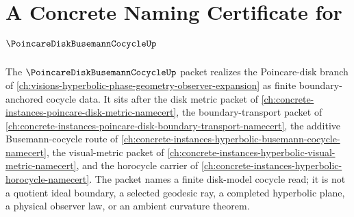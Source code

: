 \chapter{A Concrete Naming Certificate for $\PoincareDiskBusemannCocycleUp$}
\label{ch:concrete-instances-poincare-disk-busemann-cocycle-namecert}

The $\PoincareDiskBusemannCocycleUp$ packet realizes the Poincare-disk branch of \autoref{ch:visions-hyperbolic-phase-geometry-observer-expansion} as finite boundary-anchored cocycle data. It sits after the disk metric packet of \autoref{ch:concrete-instances-poincare-disk-metric-namecert}, the boundary-transport packet of \autoref{ch:concrete-instances-poincare-disk-boundary-transport-namecert}, the additive Busemann-cocycle route of \autoref{ch:concrete-instances-hyperbolic-busemann-cocycle-namecert}, the visual-metric packet of \autoref{ch:concrete-instances-hyperbolic-visual-metric-namecert}, and the horocycle carrier of \autoref{ch:concrete-instances-hyperbolic-horocycle-namecert}. The packet names a finite disk-model cocycle read; it is not a quotient ideal boundary, a selected geodesic ray, a completed hyperbolic plane, a physical observer law, or an ambient curvature theorem.

